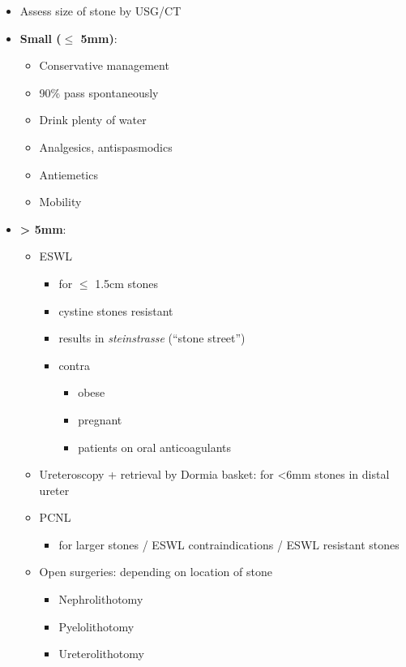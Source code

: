 \documentclass[
  12pt,
]{memoir}
\providecommand{\tightlist}{%
  \setlength{\itemsep}{0pt}\setlength{\parskip}{0pt}}
\begin{document}
\begin{itemize}
\tightlist
\item
  Assess size of stone by USG/CT
\item
  \textbf{Small (\(\le\) 5mm)}:

  \begin{itemize}
  \tightlist
  \item
    Conservative management
  \item
    90\% pass spontaneously
  \item
    Drink plenty of water
  \item
    Analgesics, antispasmodics
  \item
    Antiemetics
  \item
    Mobility
  \end{itemize}
\item
  \textbf{\textgreater{} 5mm}:

  \begin{itemize}
  \tightlist
  \item
    ESWL

    \begin{itemize}
    \tightlist
    \item
      for \(\le\) 1.5cm stones
    \item
      cystine stones resistant
    \item
      results in \emph{steinstrasse} (``stone street'')
    \item
      contra

      \begin{itemize}
      \tightlist
      \item
        obese
      \item
        pregnant
      \item
        patients on oral anticoagulants
      \end{itemize}
    \end{itemize}
  \item
    Ureteroscopy + retrieval by Dormia basket: for \textless6mm stones
    in distal ureter
  \item
    PCNL

    \begin{itemize}
    \tightlist
    \item
      for larger stones / ESWL contraindications / ESWL resistant stones
    \end{itemize}
  \item
    Open surgeries: depending on location of stone

    \begin{itemize}
    \tightlist
    \item
      Nephrolithotomy
    \item
      Pyelolithotomy
    \item
      Ureterolithotomy
    \end{itemize}
  \end{itemize}
\end{itemize}
\end{document}
